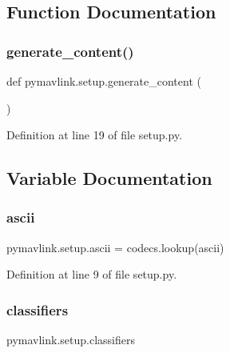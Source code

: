 \subsection{Function Documentation}
\mbox{\label{namespacepymavlink_1_1setup_a87d5649d7ea3c727f1b48e72d3a51c85}} 
\subsubsection{\texorpdfstring{generate\_content()}{generate\_content()}}
{\footnotesize\ttfamily def pymavlink.\+setup.\+generate\+\_\+content (\begin{DoxyParamCaption}{ }\end{DoxyParamCaption})}



Definition at line 19 of file setup.\+py.



\subsection{Variable Documentation}
\mbox{\label{namespacepymavlink_1_1setup_af49bf7d7e6e9bb578d581790bb0ebcd9}} 
\subsubsection{\texorpdfstring{ascii}{ascii}}
{\footnotesize\ttfamily pymavlink.\+setup.\+ascii = codecs.\+lookup(\textquotesingle{}ascii\textquotesingle{})}



Definition at line 9 of file setup.\+py.

\mbox{\label{namespacepymavlink_1_1setup_a3f9c769d98db4192cbe766b144e30730}} 
\subsubsection{\texorpdfstring{classifiers}{classifiers}}
{\footnotesize\ttfamily pymavlink.\+setup.\+classifiers}




